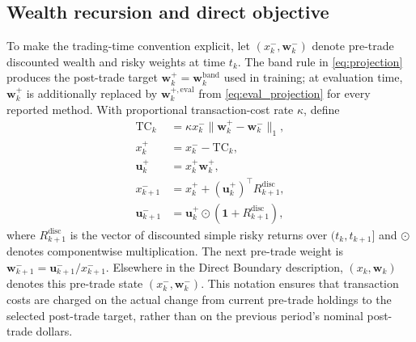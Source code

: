 \documentclass[a4paper,10pt]{article}
\newcommand{\bu}{\bm{u}}
\newcommand{\bw}{\bm{w}}
\newcommand{\bone}{\bm{1}}
\begin{document}
\subsection{Wealth recursion and direct objective}

To make the trading-time convention explicit, let $(x_k^-,\bw_k^-)$ denote pre-trade discounted wealth and risky weights at time $t_k$. The band rule in \eqref{eq:projection} produces the post-trade target $\bw_k^+=\bw_k^{\mathrm{band}}$ used in training; at evaluation time, $\bw_k^+$ is additionally replaced by $\bw_k^{+,\mathrm{eval}}$ from \eqref{eq:eval_projection} for every reported method. With proportional transaction-cost rate $\kappa$, define
\begin{align}
\mathrm{TC}_k
&=\kappa x_k^-\|\bw_k^+-\bw_k^-\|_1,\\
x_k^+&=x_k^- -\mathrm{TC}_k,\\
\bu_k^+&=x_k^+\bw_k^+,\\
x_{k+1}^-&=x_k^++(\bu_k^+)^\top R_{k+1}^{\mathrm{disc}},\\
\bu_{k+1}^-&=\bu_k^+\odot(\bone+R_{k+1}^{\mathrm{disc}}),
\label{eq:tc_wealth}
\end{align}
where $R_{k+1}^{\mathrm{disc}}$ is the vector of discounted simple risky returns over $(t_k,t_{k+1}]$ and $\odot$ denotes componentwise multiplication. The next pre-trade weight is $\bw_{k+1}^-=\bu_{k+1}^-/x_{k+1}^-$. Elsewhere in the Direct Boundary description, $(x_k,\bw_k)$ denotes this pre-trade state $(x_k^-,\bw_k^-)$. This notation ensures that transaction costs are charged on the actual change from current pre-trade holdings to the selected post-trade target, rather than on the previous period's nominal post-trade dollars.
\end{document}
